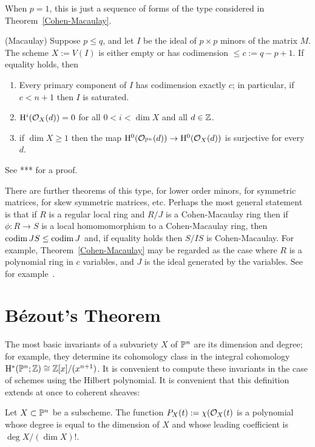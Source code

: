 When $p=1$, this is just a sequence of forms of the type considered
in Theorem~\ref{Cohen-Macaulay}. 

\begin{theorem} (Macaulay)\label{determinantal Cohen-Macaulay}
Suppose $p\leq q$, and let $I$ be the ideal of $p\times p$ minors of the matrix $M$.
The scheme $X:= V(I)$ is either empty or has codimension $\leq c:= q-p+1$. If equality holds,  then 
\begin{enumerate}
 \item Every primary component of $I$ has codimension exactly $c$; in particular, if $c<n+1$ then $I$ is saturated.
 \item $\HH^{i}(\cO_{X}(d)) = 0$ for all $0<i<\dim X$ and all $d\in \ZZ$.
 \item if $\dim X\geq 1$
then the map
$\HH^{0}(\cO_{\PP^{n}}(d)) \to \HH^{0}(\cO_{X}(d))$ is surjective for every $d$.
\end{enumerate}
\end{theorem}

See *** for a proof.

\begin{fact}
There are further theorems of this type, for lower order minors, for symmetric matrices, for skew symmetric matrices, etc. Perhaps the most general
statement is that if $R$ is a regular local ring and $R/J$ is a Cohen-Macaulay ring then if $\phi:R\to S$ is a local homomomorphism to a Cohen-Macaulay ring, then $\codim JS\leq \codim J$ and, if equality holds then
$S/IS$ is Cohen-Macaulay. For example, Theorem~\ref{Cohen-Macaulay} may be regarded as the case where
$R$ is a polynomial ring in $c$ variables, and $J$ is the ideal generated by the variables. See for example~\cite{JeeKohSuperHeight}.
\end{fact}

\section{B\'ezout's Theorem}

The most basic invariants of a subvariety $X$ of $\PP^{n}$ are its dimension and degree; for example, they determine its cohomology class in the integral cohomology $\HH^{*}(\PP^{n}; \ZZ) \cong \ZZ[x]/(x^{n+1})$.  It is convenient to compute these invariants in the case of schemes using the Hilbert polynomial. It is convenient that this definition extends at once to coherent sheaves:

\begin{theorem}
 Let $X\subset \PP^{n}$ be a subscheme. The function
 $P_{X}(t): = \chi(\cO_{X}(t)$
 is a polynomial whose degree is equal to the dimension of $X$ and whose leading coefficient
is $\deg X/(\dim X)!$. 
\end{theorem}

